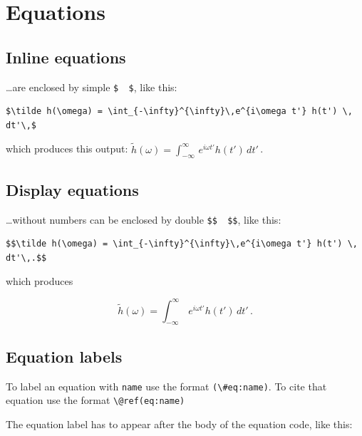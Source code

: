 \documentclass[]{book}
\begin{document}
\hypertarget{equations}{%
\chapter{Equations}\label{equations}}

\hypertarget{inline-equations}{%
\section{Inline equations}\label{inline-equations}}

\ldots{}are enclosed by simple \texttt{\$\ \ \$}, like this:

\begin{verbatim}
$\tilde h(\omega) = \int_{-\infty}^{\infty}\,e^{i\omega t'} h(t') \, dt'\,$
\end{verbatim}

which produces this output: \(\tilde h(\omega) = \int_{-\infty}^{\infty}\,e^{i\omega t'} h(t') \, dt'\,\).

\hypertarget{display-equations}{%
\section{Display equations}\label{display-equations}}

\ldots{}without numbers can be enclosed by double \texttt{\$\$\ \ \$\$}, like this:

\begin{verbatim}
$$\tilde h(\omega) = \int_{-\infty}^{\infty}\,e^{i\omega t'} h(t') \, dt'\,.$$
\end{verbatim}

which produces

\[\tilde h(\omega) = \int_{-\infty}^{\infty}\,e^{i\omega t'} h(t') \, dt'\,.\]

\hypertarget{equation-labels}{%
\section{Equation labels}\label{equation-labels}}

To label an equation with \texttt{name} use the format \texttt{(\textbackslash{}\#eq:name)}.
To cite that equation use the format \texttt{\textbackslash{}@ref(eq:name)}

The equation label has to appear after the body of the equation code, like this:
\end{document}
